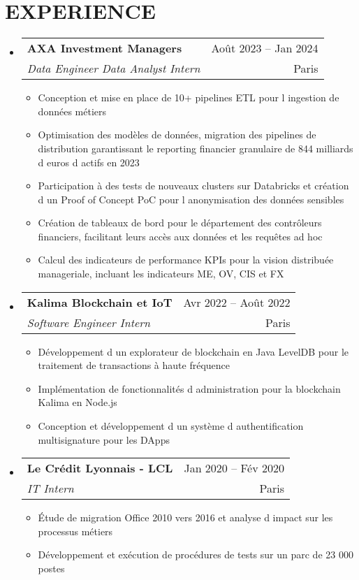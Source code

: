 \documentclass[letterpaper,11pt]{article}
\makeatletter
\newcommand{\resumeItem}[1]{
  \item\small{
    {#1 \vspace{-1pt}}
  }
}
\newcommand{\resumeSubheading}[4]{
  \vspace{-1pt}\item
    \begin{tabular*}{\textwidth}[t]{l@{\extracolsep{\fill}}r}
      \textbf{#1} & {\color{dark-grey}\small #2}\vspace{1pt}\\
      \textit{#3} & {\color{dark-grey} \small #4}\\
    \end{tabular*}\vspace{-4pt}
}
\newcommand{\resumeSubHeadingListStart}{\begin{itemize}[leftmargin=0in, label={}]}
\newcommand{\resumeSubHeadingListEnd}{\end{itemize}}
\newcommand{\resumeItemListStart}{\begin{itemize}[label={\textbullet}]}
\newcommand{\resumeItemListEnd}{\end{itemize}\vspace{0pt}}
\makeatother
\begin{document}
\section{EXPERIENCE}
\resumeSubHeadingListStart
    \resumeSubheading
      {AXA Investment Managers}{Ao\^{u}t 2023 -- Jan 2024}
      {Data Engineer   Data Analyst Intern}{Paris}
      \resumeItemListStart
        \resumeItem{Conception et mise en place de 10+ pipelines ETL pour l ingestion de donn\'{e}es m\'{e}tiers}
        \resumeItem{Optimisation des mod\`{e}les de donn\'{e}es, migration des pipelines de distribution garantissant le reporting financier granulaire de 844 milliards d euros d actifs en 2023}
        \resumeItem{Participation \`{a} des tests de nouveaux clusters sur Databricks et cr\'{e}ation d un Proof of Concept PoC pour l anonymisation des donn\'{e}es sensibles}
        \resumeItem{Cr\'{e}ation de tableaux de bord pour le d\'{e}partement des contr\^{o}leurs financiers, facilitant leurs acc\`{e}s aux donn\'{e}es et les requ\^{e}tes ad hoc}
        \resumeItem{Calcul des indicateurs de performance KPIs pour la vision distribu\'{e}e manageriale, incluant les indicateurs ME, OV, CIS et FX}
      \resumeItemListEnd
    \resumeSubheading
      {Kalima Blockchain et IoT}{Avr 2022 -- Ao\^{u}t 2022}
      {Software Engineer Intern}{Paris}
      \resumeItemListStart
        \resumeItem{D\'{e}veloppement d un explorateur de blockchain en Java LevelDB pour le traitement de transactions \`{a} haute fr\'{e}quence}
        \resumeItem{Impl\'{e}mentation de fonctionnalit\'{e}s d administration pour la blockchain Kalima en Node.js}
        \resumeItem{Conception et d\'{e}veloppement d un syst\`{e}me d authentification multisignature pour les DApps}
      \resumeItemListEnd
    \resumeSubheading
      {Le Cr\'{e}dit Lyonnais - LCL}{Jan 2020 -- F\'{e}v 2020}
      {IT Intern}{Paris}
      \resumeItemListStart
        \resumeItem{\'{E}tude de migration Office 2010 vers 2016 et analyse d impact sur les processus m\'{e}tiers}
        \resumeItem{D\'{e}veloppement et ex\'{e}cution de proc\'{e}dures de tests sur un parc de 23 000 postes}
      \resumeItemListEnd
  \resumeSubHeadingListEnd
\end{document}
